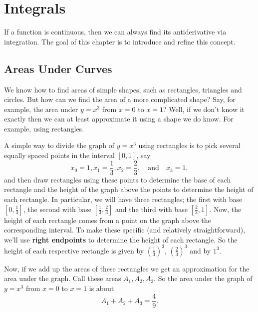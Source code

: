 \documentclass[10pt,]{book}
\newcommand{\terminology}[1]{\textbf{#1}}
\theoremstyle{ptxplainnotitle}
\theoremstyle{ptxplaintitle}
\theoremstyle{ptxplainnotitle}
\theoremstyle{ptxplaintitle}
\theoremstyle{ptxplainnotitle}
\theoremstyle{ptxplaintitle}
\theoremstyle{ptxdefinitionnotitle}
\theoremstyle{ptxdefinitiontitle}
\theoremstyle{ptxdefinitionnotitle}
\theoremstyle{ptxdefinitiontitle}
\theoremstyle{ptxdefinitionnotitle}
\theoremstyle{ptxdefinitiontitle}
\theoremstyle{ptxdefinitionnotitle}
\theoremstyle{ptxdefinitiontitle}
\theoremstyle{ptxdefinitionnotitle}
\theoremstyle{ptxdefinitiontitle}
\numberwithin{equation}{section}
\begin{document}
\chapter[{Integrals}]{Integrals}\label{integrals}
\hypertarget{p-401}{}%
If a function is continuous, then we can always find its antiderivative via integration. The goal of this chapter is to introduce and refine this concept.%
\typeout{************************************************}
\typeout{************************************************}
\section[{Areas Under Curves}]{Areas Under Curves}\label{section-areas-under-curves}
\hypertarget{p-402}{}%
We know how to find areas of simple shapes, such as rectangles, triangles and circles. But how can we find the area of a more complicated shape? Say, for example, the area under \(y=x^{3}\) from \(x=0\) to \(x=1\)? Well, if we don't know it exactly then we can at least approximate it using a shape we do know. For example, using rectangles.%
\par
\hypertarget{p-403}{}%
A simple way to divide the graph of \(y=x^{3}\) using rectangles is to pick several equally spaced points in the interval \([0,1]\), say%
\begin{equation*}
x_{0} = 1, x_{1} = \frac{1}{3}, x_{2} = \frac{2}{3}, \quad\text{and}\quad x_{3} = 1,
\end{equation*}
and then draw rectangles using these points to determine the base of each rectangle and the height of the graph above the points to determine the height of each rectangle. In particular, we will have three rectangles; the first with base \([0,\frac{1}{3}]\), the second with base \([\frac{1}{3},\frac{2}{3}]\) and the third with base \([\frac{2}{3},1]\). Now, the height of each rectangle comes from a point on the graph above the corresponding interval. To make these specific (and relatively straightforward), we'll use \terminology{right endpoints} to determine the height of each rectangle. So the height of each respective rectangle is given by \((\frac{1}{3})^{3}\), \((\frac{2}{3})^{3}\) and by \(1^{3}\).%
\par
\hypertarget{p-404}{}%
Now, if we add up the areas of these rectangles we get an approximation for the area under the graph. Call these areas \(A_{1},A_{2},A_{3}\). So the area under the graph of \(y = x^{3}\) from \(x=0\) to \(x=1\) is about%
\begin{equation*}
A_{1} + A_{2} + A_{3} = \frac{4}{9}.
\end{equation*}
\end{document}
